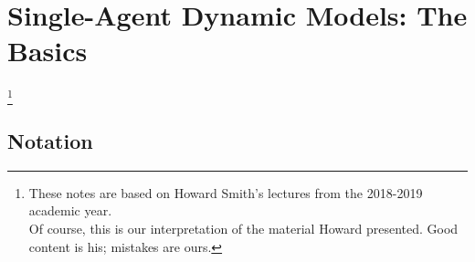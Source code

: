 \documentclass[11pt]{article}
\newcommand\blfootnote[1]{%
	\begingroup
	\renewcommand\thefootnote{}\footnote{#1}%
	\addtocounter{footnote}{-1}%
	\endgroup
}
\begin{document}
\onehalfspacing

\section{Single-Agent Dynamic Models: The Basics}\label{s1}

\blfootnote{These notes are based on Howard Smith's lectures from the 2018-2019 academic year.\\
Of course, this is our interpretation of the material Howard presented. Good content is his; mistakes are ours.}

\vspace{-1cm}

	\subsection*{Notation}
\end{document}
